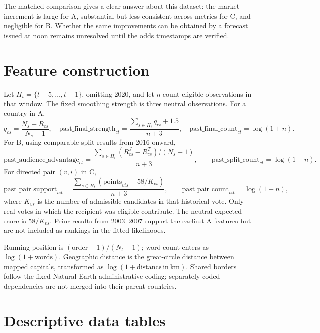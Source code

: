 \documentclass[11pt,a4paper]{article}
\begin{document}
The matched comparison gives a clear answer about this dataset: the market increment is large for A, substantial but less consistent across metrics for C, and negligible for B. Whether the same improvements can be obtained by a forecast issued at noon remains unresolved until the odds timestamps are verified.

\appendix
\section{Feature construction}\label{app:features}
Let $H_t=\{t-5,\ldots,t-1\}$, omitting 2020, and let $n$ count eligible observations in that window. The fixed smoothing strength is three neutral observations. For a country in A,
\[
 q_{cs}=\frac{N_s-R_{cs}}{N_s-1},\quad
 \mathrm{past\_final\_strength}_{ct}=\frac{\sum_{s\in H_t}q_{cs}+1.5}{n+3},\quad
 \mathrm{past\_final\_count}_{ct}=\log(1+n).
\]
For B, using comparable split results from 2016 onward,
\[
 \mathrm{past\_audience\_advantage}_{ct}
 =\frac{\sum_{s\in H_t}(R^J_{cs}-R^T_{cs})/(N_s-1)}{n+3},\qquad
 \mathrm{past\_split\_count}_{ct}=\log(1+n).
\]
For directed pair $(v,i)$ in C,
\[
 \mathrm{past\_pair\_support}_{vit}
 =\frac{\sum_{s\in H_t}(\mathrm{points}_{vis}-58/K_{vs})}{n+3},\qquad
 \mathrm{past\_pair\_count}_{vit}=\log(1+n),
\]
where $K_{vs}$ is the number of admissible candidates in that historical vote. Only real votes in which the recipient was eligible contribute. The neutral expected score is $58/K_{vs}$. Prior results from 2003--2007 support the earliest A features but are not included as rankings in the fitted likelihoods.

Running position is $(\mathrm{order}-1)/(N_t-1)$; word count enters as $\log(1+\mathrm{words})$. Geographic distance is the great-circle distance between mapped capitals, transformed as $\log(1+\mathrm{distance\ in\ km})$. Shared borders follow the fixed Natural Earth administrative coding; separately coded dependencies are not merged into their parent countries.

\section{Descriptive data tables}\label{app:data}
\begin{table}[H]\centering\small
\caption{Annual coverage. ``Audience $>$ jury'' counts a better audience rank. ``Votes'' counts eligible national choice events; ``candidate rows'' counts alternatives within those events. Zero split-ranking or market observations in the early years indicate unavailable coverage. There was no contest in 2020.}\label{tab:annualdata}

\end{table}
\end{document}
